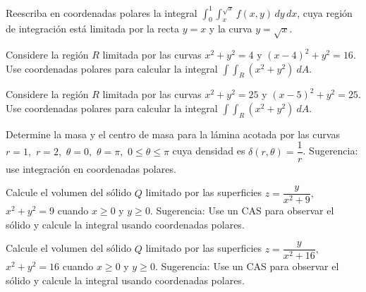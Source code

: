 \begin{prob}
Reescriba en coordenadas polares la integral
$\displaystyle\int_0^1\int_{x}^{\sqrt{x}} f(x,y)\,dy\,dx$, cuya región de
integración está limitada por la recta $y=x$ y la curva $y=\sqrt{x}$.
\end{prob}

\begin{prob}
Considere la región $R$ limitada por las curvas $x^2+y^2=4$ y  $(x - 4)^{2} + y^{2} = 16.$ Use coordenadas polares para calcular la integral $\displaystyle\int\int_{R}    \left(x^2+y^2\right)\ dA $.
\end{prob}

\begin{prob}
Considere la región $R$ limitada por las curvas $x^2+y^2=25$ y  $(x - 5)^{2} + y^{2} = 25.$ Use coordenadas polares para calcular la integral $\displaystyle\int\int_{R}   \left(x^2+y^2\right) \  dA$.
\end{prob}

\begin{prob}
Determine la masa y el centro de masa para la lámina acotada por las curvas $r=1,$ $r=2,$ $\theta=0,$ $\theta=\pi,$ $0\leq \theta \leq \pi$ cuya densidad es $\delta(r,\theta)=\dfrac{1}{r}$. Sugerencia: use integración en coordenadas polares.
\end{prob}

\begin{prob}
Calcule el volumen del sólido $Q$ limitado por las superficies $z=\dfrac{y}{x^2+9},$ $x^2+y^2=9$ cuando $x\geq 0$ y $y\geq 0.$ Sugerencia: Use un CAS para observar el sólido y calcule la integral usando coordenadas polares.
\end{prob}

\begin{prob}
Calcule el volumen del sólido $Q$ limitado por las superficies $z=\dfrac{y}{x^2+16},$ $x^2+y^2=16$ cuando $x\geq 0$ y $y\geq 0.$ Sugerencia: Use un CAS para observar el sólido y calcule la integral usando coordenadas polares.
\end{prob}

